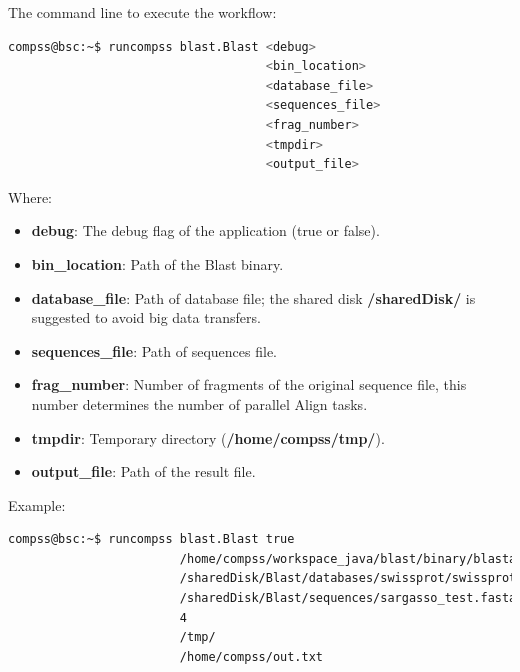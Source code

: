 The command line to execute the workflow:

\begin{lstlisting}[language=bash]
compss@bsc:~$ runcompss blast.Blast <debug> 
                                    <bin_location>
                                    <database_file> 
                                    <sequences_file>
                                    <frag_number> 
                                    <tmpdir>
                                    <output_file>
\end{lstlisting}

Where:
\begin{itemize}
 \item {\bf debug}: The debug flag of the application (true or false).
 \item {\bf bin\_location}: Path of the Blast binary.
 \item {\bf database\_file}: Path of database file; the shared disk {\bf /sharedDisk/} is suggested to avoid big data transfers.
 \item {\bf sequences\_file}: Path of sequences file.
 \item {\bf frag\_number}: Number of fragments of the original sequence file, this number determines the number of parallel Align tasks.
 \item {\bf tmpdir}: Temporary directory ({\bf /home/compss/tmp/}).
 \item {\bf output\_file}: Path of the result file.
\end{itemize}
 
Example:
\begin{lstlisting}[language=bash]
compss@bsc:~$ runcompss blast.Blast true
                        /home/compss/workspace_java/blast/binary/blastall
                        /sharedDisk/Blast/databases/swissprot/swissprot
                        /sharedDisk/Blast/sequences/sargasso_test.fasta 
                        4 
                        /tmp/
                        /home/compss/out.txt
\end{lstlisting}